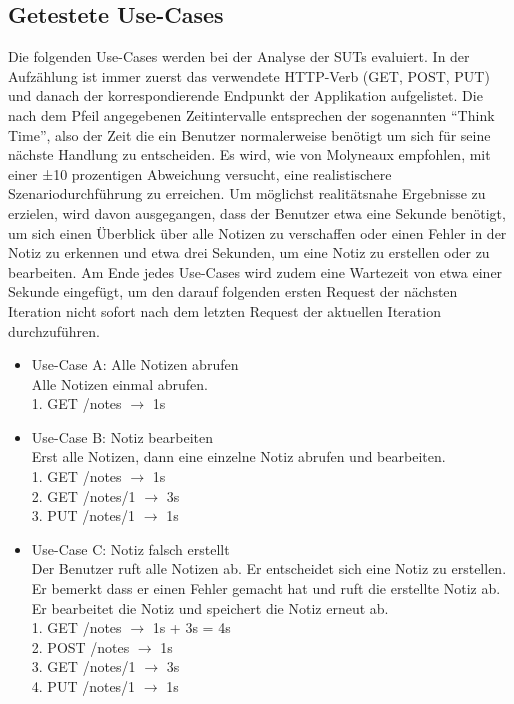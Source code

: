 \subsection{Getestete Use-Cases}\label{sec:use-cases}
Die folgenden Use-Cases werden bei der Analyse der \acp{SUT} evaluiert. 
In der Aufzählung ist immer zuerst das verwendete HTTP-Verb (GET, POST, PUT) und danach der korrespondierende Endpunkt der Applikation aufgelistet. Die nach dem Pfeil angegebenen Zeitintervalle entsprechen der sogenannten "`Think Time"', also der Zeit die ein Benutzer normalerweise benötigt um sich für seine nächste Handlung zu entscheiden. Es wird, wie von Molyneaux empfohlen, mit einer ±10 prozentigen Abweichung versucht, eine realistischere Szenariodurchführung zu erreichen\cite{molyneaux_art_2014}. Um möglichst realitätsnahe Ergebnisse zu erzielen, wird davon ausgegangen, dass der Benutzer etwa eine Sekunde benötigt, um sich einen Überblick über alle Notizen zu verschaffen oder einen Fehler in der Notiz zu erkennen und etwa drei Sekunden, um eine Notiz zu erstellen oder zu bearbeiten. Am Ende jedes Use-Cases wird zudem eine Wartezeit von etwa einer Sekunde eingefügt, um den darauf folgenden ersten Request der nächsten Iteration nicht sofort nach dem letzten Request der aktuellen Iteration durchzuführen. 
\begin{itemize}
    \item Use-Case A: Alle Notizen abrufen \\
        Alle Notizen einmal abrufen. \\
        1. GET /notes $\rightarrow$ 1s     \\

    \item Use-Case B: Notiz bearbeiten \\
        Erst alle Notizen, dann eine einzelne Notiz abrufen und bearbeiten. \\
        1. GET /notes $\rightarrow$ 1s     \\
        2. GET /notes/1 $\rightarrow$ 3s   \\
        3. PUT /notes/1 $\rightarrow$ 1s   \\
        
    \item Use-Case C: Notiz falsch erstellt \\
    Der Benutzer ruft alle Notizen ab. Er entscheidet sich eine Notiz zu erstellen. Er bemerkt dass er einen Fehler gemacht hat und ruft die erstellte Notiz ab. Er bearbeitet die Notiz und speichert die Notiz erneut ab. \\
        1. GET /notes   $\rightarrow$ 1s + 3s = 4s  \\
        2. POST /notes  $\rightarrow$ 1s   \\
        3. GET /notes/1 $\rightarrow$ 3s   \\
        4. PUT /notes/1 $\rightarrow$ 1s   \\
\end{itemize}


